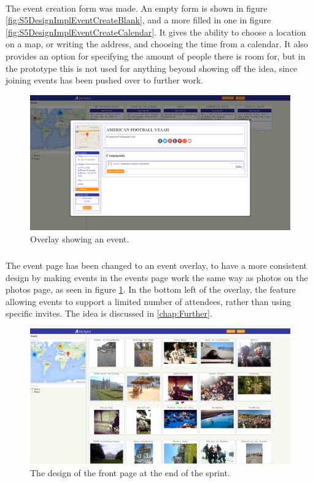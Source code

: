 \paragraph{} The event creation form was made. An empty form is shown in figure \ref{fig:S5DesignImplEventCreateBlank}, and a more filled in one in figure \ref{fig:S5DesignImplEventCreateCalendar}. It gives the ability to choose a location on a map, or writing the address, and choosing the time from a calendar. It also provides an option for specifying the amount of people there is room for, but in the prototype this is not used for anything beyond showing off the idea, since joining events has been pushed over to further work.

\begin{figure}[ht!]
  \centering
  \includegraphics[width=\linewidth]{./img/webpage/3Nov/EventsOverlay}
  \caption{Overlay showing an event.}
  \label{fig:S5DesignImplEventsOverlay}
\end{figure}

\subparagraph{} The event page has been changed to an event overlay, to have a more consistent design by making events in the events page work the same way as photos on the photos page, as seen in figure \ref{fig:S5DesignImplEventsOverlay}. In the bottom left of the overlay, the feature allowing events to support a limited number of attendees, rather than using specific invites. The idea is discussed in \ref{chap:Further}.

\begin{figure}[ht!]
  \centering
  \includegraphics[width=\linewidth]{./img/webpage/3Nov/FrontpagePhotos}
  \caption{The design of the front page at the end of the sprint.}
  \label{fig:S5DesignImplFrontPhotos3Nov}
\end{figure}

